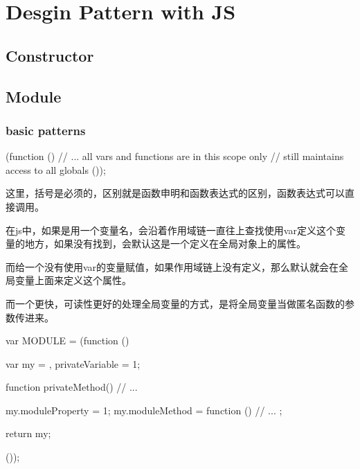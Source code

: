 \chapter{Desgin Pattern with JS}

\section{Constructor}

\section{Module}

\subsection{basic patterns}

\begin{JavaScript}[立刻执行的匿名函数]
(function () {
	// ... all vars and functions are in this scope only
	// still maintains access to all globals
}());
\end{JavaScript}

这里，括号是必须的，区别就是函数申明和函数表达式的区别，函数表达式可以直接调用。




在js中，如果是用一个变量名，会沿着作用域链一直往上查找使用var定义这个变量的地方，如果没有找到，会默认这是一个定义在全局对象上的属性。

而给一个没有使用var的变量赋值，如果作用域链上没有定义，那么默认就会在全局变量上面来定义这个属性。

而一个更快，可读性更好的处理全局变量的方式，是将全局变量当做匿名函数的参数传进来。




\begin{JavaScript}
var MODULE = (function () {
	var my = {},
		privateVariable = 1;

	function privateMethod() {
		// ...
	}

	my.moduleProperty = 1;
	my.moduleMethod = function () {
		// ...
	};

	return my;
}());
\end{JavaScript}


